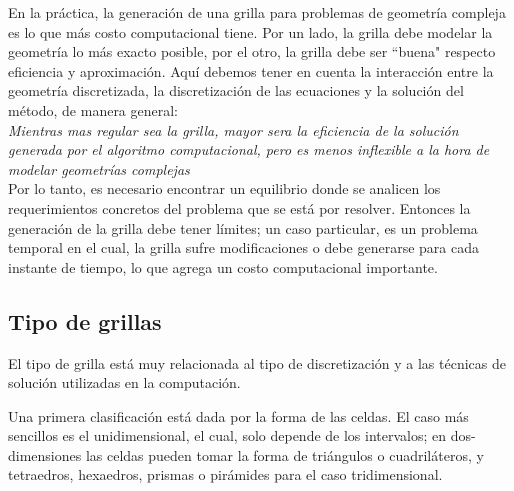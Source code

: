 \documentclass[a4paper,10pt, oneside]{book}
\begin{document}
En la práctica, la generación de una grilla para problemas de geometría compleja es lo que más costo computacional tiene. Por un lado, la grilla debe modelar la geometría lo más exacto posible, por el otro, la grilla debe ser ``buena" respecto eficiencia y aproximación. Aquí debemos tener en cuenta la interacción entre la geometría discretizada, la discretización de las ecuaciones y la solución del método, de manera general: \\

\textit{Mientras mas regular sea la grilla, mayor sera la eficiencia de la solución generada por el algoritmo computacional, pero es menos inflexible a la hora de modelar geometrías complejas} \\

Por lo tanto, es necesario encontrar un equilibrio donde se analicen los requerimientos concretos del problema que se está por resolver. Entonces la generación de la grilla debe tener límites; un caso particular, es un problema temporal en el cual, la grilla sufre modificaciones o debe generarse para cada instante de tiempo, lo que agrega un costo computacional importante.

\subsection{Tipo de grillas}

El tipo de grilla está muy relacionada al tipo de discretización y a las técnicas de solución utilizadas en la computación.

Una primera clasificación está dada por la forma de las celdas. El caso más sencillos es el unidimensional, el cual, solo depende de los intervalos; en dos-dimensiones las celdas pueden tomar la forma de triángulos o cuadriláteros, y tetraedros, hexaedros, prismas o pirámides para el caso tridimensional.
\end{document}
